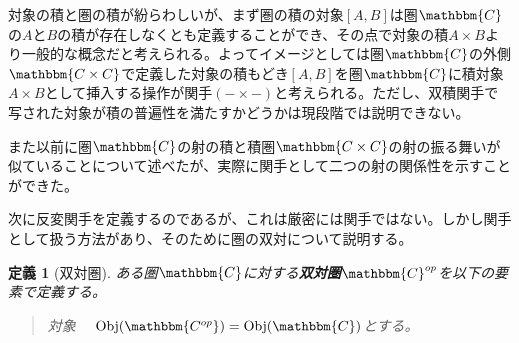 \documentclass[uplatex,dvipdfmx]{jsarticle}
\newcommand{\cat}[1]{\mathbbm{#1}}
\newcommand{\obj}[1]{\mathrm{Obj}(\cat{#1})}
\newcommand{\pcobj}[1]{[#1]}
\newtheorem{define}[proof]{定義}
\numberwithin{proof}{subsection}
\newenvironment{mydescription}
{\begin{description}
  \setlength{\parskip}{0.5cm}
}
{\end{description}}
\begin{document}
	対象の積と圏の積が紛らわしいが、まず圏の積の対象$\pcobj{A,B}$は圏$\cat{C}$の$A$と$B$の積が存在しなくとも定義することができ、その点で対象の積$A\times B$より一般的な概念だと考えられる。よってイメージとしては圏$\cat{C}$の外側$\cat{C\times C}$で定義した対象の積もどき$[A,B]$を圏$\cat{C}$に積対象$A\times B$として挿入する操作が関手$(-\times-)$と考えられる。ただし、双積関手で写された対象が積の普遍性を満たすかどうかは現段階では説明できない。

	また以前に圏$\cat{C}$の射の積と積圏$\cat{C\times C}$の射の振る舞いが似ていることについて述べたが、実際に関手として二つの射の関係性を示すことができた。

  次に反変関手を定義するのであるが、これは厳密には関手ではない。しかし関手として扱う方法があり、そのために圏の双対について説明する。
	\begin{define}[双対圏]
		ある圏$\cat{C}$に対する\textbf{双対圏}$\cat{C}^{op}$を以下の要素で定義する。
		\begin{quote}
			\begin{mydescription}
				\item[対象]　$\obj{C^{op}}=\obj{C}$とする。


\end{mydescription}
\end{quote}
\end{define}
\end{document}
